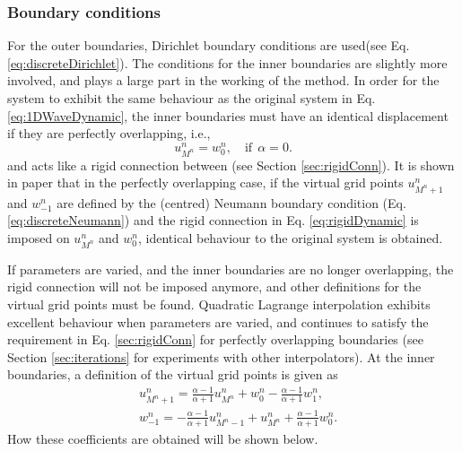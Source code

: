 \subsubsection{Boundary conditions}
For the outer boundaries, Dirichlet boundary conditions are used(see Eq. \eqref{eq:discreteDirichlet}).
The conditions for the inner boundaries are slightly more involved, and plays a large part in the working of the method. 
In order for the system to exhibit the same behaviour as the original system in Eq. \eqref{eq:1DWaveDynamic}, the inner boundaries must have an identical displacement if they are perfectly overlapping, i.e.,
\begin{equation}\label{eq:rigidDynamic}
    u_{M^n}^n = w_0^n, \quad \text{if}\ \ \alpha = 0.
\end{equation}
and acts like a rigid connection between (see Section \ref{sec:rigidConn}). It is shown in paper \citeP[G] that in the perfectly overlapping case, if the virtual grid points $u_{M^n+1}^n$ and $w_{-1}^n$ are defined by the (centred) Neumann boundary condition (Eq. \eqref{eq:discreteNeumann}) and the rigid connection in Eq. \eqref{eq:rigidDynamic} is imposed on $u_{M^n}^n$ and $w_0^n$, identical behaviour to the original system is obtained. 

If parameters are varied, and the inner boundaries are no longer overlapping, the rigid connection will not be imposed anymore, and other definitions for the virtual grid points must be found. Quadratic Lagrange interpolation exhibits excellent behaviour when parameters are varied, and continues to satisfy the requirement in Eq. \eqref{sec:rigidConn} for perfectly overlapping boundaries (see Section \ref{sec:iterations} for experiments with other interpolators). At the inner boundaries, a definition of the virtual grid points is given as
\begin{subequations}\label{eq:connectionInterpol}
    \begin{align}
            &u_{M^n+1}^n = \frac{\alpha - 1}{\alpha + 1}u_{M^n}^n + w_0^n - \frac{\alpha - 1}{\alpha + 1}w_1^n,
        \label{eq:calcUMP1}\\
            &w_{-1}^n = -\frac{\alpha - 1}{\alpha + 1}u_{M^n-1}^n + u_{M^n}^n+ \frac{\alpha - 1}{\alpha + 1}w_{0}^n.\label{eq:calcWM1}
    \end{align}
\end{subequations}
How these coefficients are obtained will be shown below. 

